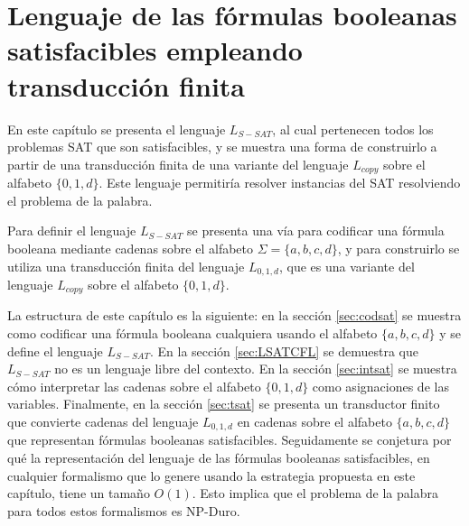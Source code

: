 


\chapter{Lenguaje de las fórmulas booleanas satisfacibles empleando transducción finita}
\label{chap:LSATFT}


En este capítulo se presenta el lenguaje $L_{S-SAT}$, al cual pertenecen todos los problemas SAT que son 
satisfacibles, y se muestra una forma de construirlo a partir de una transducción finita de una variante 
del lenguaje $L_{copy}$ sobre el alfabeto $\{0,1,d\}$. Este lenguaje permitiría resolver instancias del SAT resolviendo el problema de la palabra.  

Para definir el lenguaje $L_{S-SAT}$ se presenta una vía para codificar una fórmula booleana mediante cadenas sobre el alfabeto $\Sigma=\{a, b,c,d\}$, y para construirlo se utiliza una transducción finita del lenguaje $L_{0,1,d}$, que es una variante del lenguaje $L_{copy}$ sobre el alfabeto $\{0,1,d\}$.

La estructura de este capítulo es la siguiente: en la sección \ref{sec:codsat} se muestra como codificar una fórmula booleana cualquiera usando el alfabeto $\{a,b,c,d\}$ y se define el lenguaje $L_{S-SAT}$.  En la sección \ref{sec:LSATCFL} se demuestra que $L_{S-SAT}$ no es un lenguaje libre del contexto.  En la sección \ref{sec:intsat} se muestra cómo interpretar las cadenas sobre el alfabeto $\{0,1,d\}$ como asignaciones de las variables. Finalmente, en la sección \ref{sec:tsat} se presenta un transductor finito que convierte cadenas del lenguaje $L_{0,1,d}$ en cadenas sobre el alfabeto $\{a,b,c,d\}$ que representan fórmulas booleanas satisfacibles. Seguidamente se conjetura por qué la representación del lenguaje de las fórmulas booleanas satisfacibles, en cualquier formalismo que lo genere usando la estrategia propuesta en este capítulo, tiene un tamaño $O(1)$. Esto implica que el problema de la palabra para todos estos formalismos es NP-Duro.



